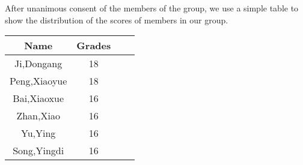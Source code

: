 \noindent After unanimous consent of the members of the group, we use a simple table to show the distribution of the scores of members in our group.


    
\begin{center}

\begin{table}[H]
\centering
\begin{tabular}{ccll}
\rowcolor[HTML]{FD6864} 
{\color[HTML]{333333} Name} & {\color[HTML]{333333} Grades} \\ \hline
Ji,Dongang                  & 18                            \\ \hline
Peng,Xiaoyue                & 18                            \\ \hline
Bai,Xiaoxue                 & 16                            \\ \hline
Zhan,Xiao                   & 16                            \\ \hline
Yu,Ying                     & 16                            \\ \hline
Song,Yingdi                 & 16                            \\ \hline
\end{tabular}
\end{table}
    
\end{center}